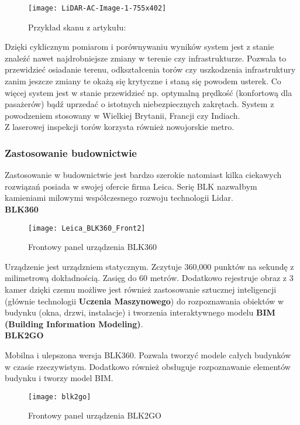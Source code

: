 \begin{figure}[h]
    \centering
    \texttt{[image: LiDAR-AC-Image-1-755x402]}
    \caption{Przykład skanu z artykułu: \cite{tory}}
    \label{fig:tory}
\end{figure}

Dzięki cyklicznym pomiarom i porównywaniu wyników system jest z stanie znaleźć nawet najdrobniejsze zmiany w terenie czy infrastrukturze. Pozwala to przewidzieć osiadanie terenu, odkształcenia torów czy uszkodzenia infrastruktury zanim jeszcze zmiany te okażą się krytyczne i staną się powodem usterek. Co więcej system jest w stanie przewidzieć np. optymalną prędkość (konfortową dla pasażerów) bądź uprzedać o istotnych niebezpiecznych zakrętach. System z powodzeniem stosowany w Wielkiej Brytanii, Francji czy Indiach.\\

Z laserowej inspekcji torów korzysta również nowojorskie metro.

\subsubsection{Zastosowanie budownictwie}
Zastosowanie w budownictwie jest bardzo szerokie natomiast kilka ciekawych rozwiązań posiada w swojej ofercie firma Leica. Serię BLK nazwałbym kamieniami milowymi współczesnego rozwoju technologii Lidar.\\

\textbf{BLK360}

\begin{figure}[h]
    \centering
    \texttt{[image: Leica\_BLK360\_Front2]}
    \caption{Frontowy panel urządzenia BLK360 \cite{blk360}}
    \label{fig:blk360}
\end{figure}

Urządzenie jest urządzniem statycznym. Zczytuje 360,000 punktów na sekundę z milimetrową dokładnością. Zasięg do 60 metrów. Dodatkowo rejestruje obraz z 3 kamer dzięki czemu możliwe jest również zastosowanie sztucznej inteligencji (głównie technologii \textbf{Uczenia Maszynowego}) do rozpoznawania obiektów w budynku (okna, drzwi, instalacje) i tworzenia interaktywnego modelu \textbf{BIM (Building Information Modeling)}.\\

\textbf{BLK2GO}

Mobilna i ulepszona wersja BLK360. Pozwala tworzyć modele całych budynków w czasie rzeczywistym. Dodatkowo również obsługuje rozpoznawanie elementów budynku i tworzy model BIM.\\
\begin{figure}[h]
    \centering
    \texttt{[image: blk2go]}
    \caption{Frontowy panel urządzenia BLK2GO \cite{blk2go}}
    \label{fig:blk2go}
\end{figure}

